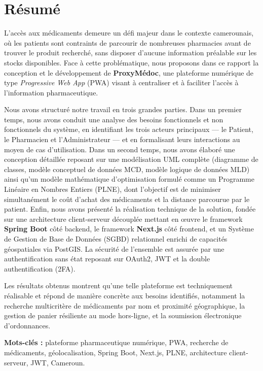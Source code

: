 \documentclass[12pt,a4paper]{report}
\begin{document}
    \newpage %
    \section*{Résumé}
	L'accès aux médicaments demeure un défi majeur dans le contexte camerounais, où les patients sont contraints de parcourir de nombreuses pharmacies avant de trouver le produit recherché, sans disposer d'aucune information préalable sur les stocks disponibles. Face à cette problématique, nous proposons dans ce rapport la conception et le développement de \textbf{ProxyMédoc}, une plateforme numérique de type \textit{Progressive Web App} (PWA) visant à centraliser et à faciliter l'accès à l'information pharmaceutique.

	Nous avons structuré notre travail en trois grandes parties. Dans un premier temps, nous avons conduit une analyse des besoins fonctionnels et non fonctionnels du système, en identifiant les trois acteurs principaux --- le Patient, le Pharmacien et l'Administrateur --- et en formalisant leurs interactions au moyen de cas d'utilisation. Dans un second temps, nous avons élaboré une conception détaillée reposant sur une modélisation UML complète (diagramme de classes, modèle conceptuel de données MCD, modèle logique de données MLD) ainsi qu'un modèle mathématique d'optimisation formulé comme un Programme Linéaire en Nombres Entiers (PLNE), dont l'objectif est de minimiser simultanément le coût d'achat des médicaments et la distance parcourue par le patient. Enfin, nous avons présenté la réalisation technique de la solution, fondée sur une architecture client-serveur découplée mettant en \oe{}uvre le framework \textbf{Spring Boot} côté backend, le framework \textbf{Next.js} côté frontend, et un Système de Gestion de Base de Données (SGBD) relationnel enrichi de capacités géospatiales via PostGIS. La sécurité de l'ensemble est assurée par une authentification sans état reposant sur OAuth2, JWT et la double authentification (2FA).

	Les résultats obtenus montrent qu'une telle plateforme est techniquement réalisable et répond de manière concrète aux besoins identifiés, notamment la recherche multicritère de médicaments par nom et proximité géographique, la gestion de panier résiliente au mode hors-ligne, et la soumission électronique d'ordonnances.

	\vspace{0.5cm}
	\noindent\textbf{Mots-clés :} plateforme pharmaceutique numérique, PWA, recherche de médicaments, géolocalisation, Spring Boot, Next.js, PLNE, architecture client-serveur, JWT, Cameroun.
\end{document}
